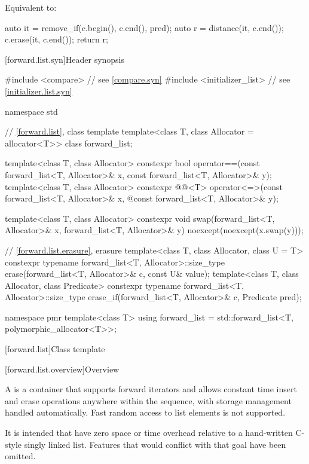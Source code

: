 \begin{itemdescr}
\pnum
\effects
Equivalent to:
\begin{codeblock}
auto it = remove_if(c.begin(), c.end(), pred);
auto r = distance(it, c.end());
c.erase(it, c.end());
return r;
\end{codeblock}
\end{itemdescr}

[forward.list.syn]{Header  synopsis}

%
\begin{codeblock}
#include <compare>              // see \ref{compare.syn}
#include <initializer_list>     // see \ref{initializer.list.syn}

namespace std {
  // \ref{forward.list}, class template 
  template<class T, class Allocator = allocator<T>> class forward_list;

  template<class T, class Allocator>
    constexpr bool operator==(const forward_list<T, Allocator>& x,
                              const forward_list<T, Allocator>& y);
  template<class T, class Allocator>
    constexpr @@<T> operator<=>(const forward_list<T, Allocator>& x,
    @\itcorr@                                            const forward_list<T, Allocator>& y);

  template<class T, class Allocator>
    constexpr void swap(forward_list<T, Allocator>& x, forward_list<T, Allocator>& y)
      noexcept(noexcept(x.swap(y)));

  // \ref{forward.list.erasure}, erasure
  template<class T, class Allocator, class U = T>
    constexpr typename forward_list<T, Allocator>::size_type
      erase(forward_list<T, Allocator>& c, const U& value);
  template<class T, class Allocator, class Predicate>
    constexpr typename forward_list<T, Allocator>::size_type
      erase_if(forward_list<T, Allocator>& c, Predicate pred);

  namespace pmr {
    template<class T>
      using forward_list = std::forward_list<T, polymorphic_allocator<T>>;
  }
}
\end{codeblock}

[forward.list]{Class template }

[forward.list.overview]{Overview}

\pnum
A  is a container that supports forward iterators and allows
constant time insert and erase operations anywhere within the sequence, with storage
management handled automatically. Fast random access to list elements is not supported.
\begin{note}
It is intended that  have zero space or time overhead
relative to a hand-written C-style singly linked list. Features that would conflict with
that goal have been omitted.
\end{note}

